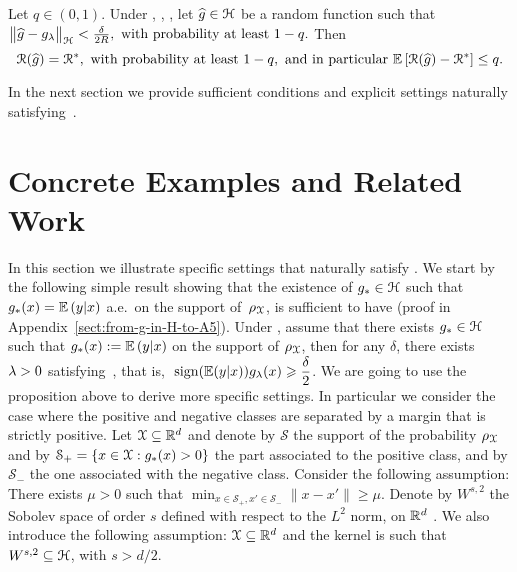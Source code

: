 \documentclass[final]{colt2018} %
\begin{document}
\label{lm:appr-correct-sign-to-01}
Let $q \in (0,1)$. Under , , , let $\widehat{g} \in \mathcal H$ be a random function such that
$ \bigl\|{\widehat{g} - g_\lambda}\bigr\|_\mathcal H < \frac{\delta}{2R}, \mbox{ with probability at least }1-q .$
Then 
$$ {\cal R}(\widehat{g}) = {\cal R}^*, \mbox{ with probability at least }1-q,\ \textrm{and in particular}\  \mathbb{E}\left[{{\cal R}(\widehat{g}) - {\cal R}^*}\right] \leq q.$$
\elm

In the next section we provide sufficient conditions and explicit settings naturally satisfying~.

\section{Concrete Examples and Related Work}
\label{sec:examples}
In this section we illustrate specific settings that naturally satisfy . We start by the following simple result showing that the existence of $g_\ast \in \mathcal H$ such that $g_\ast(x) = \mathbb{E}\left({y}\middle|{x}\right)$ a.e.~on the support of~${\rho_{{\mathcal X}}}$, is sufficient to have  (proof in Appendix~\ref{sect:from-g-in-H-to-A5}). 
\bp\label{prop:gstar-in-hh-gives-gla-good}
Under , assume that there exists  $g_* \in \mathcal H$
such that $g_*(x) := \mathbb{E}\left({y}\middle|{x}\right)$ on the support of ${\rho_{{\mathcal X}}}$, then for any $\delta$, there exists $\lambda > 0$ satisfying~, that is,  $\ \displaystyle \mathop{ \mathrm{sign}}( {\mathbb E}(y|x) ) g_\lambda(x) \geqslant \frac{\delta}{2}$.
\ep  
%
We are going to use the proposition above to derive more specific settings. In particular we consider the case where the positive and negative classes are separated by a margin that is strictly positive. Let ${\mathcal X} \subseteq \mathbb R^d$ and denote by $\mathcal{S}$ the support of the probability ${\rho_{{\mathcal X}}}$ and by $\mathcal{S}_+ = \{x \in {\mathcal X} : g_*(x) > 0\}$ the part associated to the positive class, and by $\mathcal{S}_-$ the one associated with the negative class. Consider the following assumption:
\bas\label{asm:margin}
There exists $\mu > 0$ such that $\min_{x \in \mathcal{S}_+, x' \in \mathcal{S}_-} \|x - x'\| \geq \mu$.
\eas
%
Denote by $W^{s,2}$ the Sobolev space of order $s$ defined with respect to the $L^2$ norm, on $\mathbb R^d$ \citep[see][and Appendix~\ref{sect:A5-examples}]{adams2003sobolev}. We also introduce the following assumption:
\bas\label{asm:kernel-rich}
${\mathcal X} \subseteq \mathbb R^d$ and the kernel is such that $W^{s,2} \subseteq \mathcal H$, with $s > d/2$.
\end{document}
